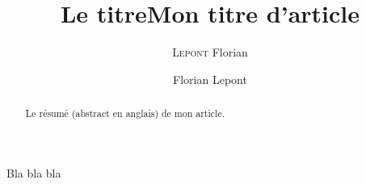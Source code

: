 \documentclass[a4paper,10pt]{report}
\title{Le titre}
\author{\textsc{Lepont} Florian}
\date{} %
\title{Mon titre d'article}
\date{}
\author{Florian Lepont}
\begin{document}
	
\maketitle

\begin{abstract}
Le résumé (abstract en anglais) de mon article.
\end{abstract}


\tableofcontents


Bla bla bla

\listoffigures
\listoftables
\printindex
\end{document}
